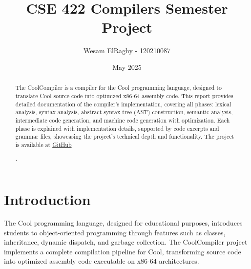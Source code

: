 \documentclass[12pt]{article}
\title{\textbf{CSE 422 Compilers Semester Project }}
\author{Wesam ElRaghy -  120210087}
\date{May 2025}
\begin{document}
\maketitle
\begin{abstract}
The CoolCompiler is a compiler for the Cool programming language, designed to translate Cool source code into optimized x86-64 assembly code. This report provides detailed documentation of the compiler's implementation, covering all phases: lexical analysis, syntax analysis, abstract syntax tree (AST) construction, semantic analysis, intermediate code generation, and machine code generation with optimization. Each phase is explained with implementation details, supported by code excerpts and grammar files, showcasing the project's technical depth and functionality. The project is available at \href{https://github.com/WesamElRaghy/CoolCompiler/tree/main}{GitHub} \newline \newline\newline
\newline
\newline
\newline
\newline
\newline
\newline
\newline
\newline
\newline
\newline
\newline
\newline
\newline
\newline
\newline
\newline
\newline
\newline
\newline
\newline
\newline
\newline
\newline
\newline


.
\end{abstract}


\tableofcontents



\section{Introduction}
The Cool programming language, designed for educational purposes, introduces students to object-oriented programming through features such as classes, inheritance, dynamic dispatch, and garbage collection. The CoolCompiler project implements a complete compilation pipeline for Cool, transforming source code into optimized assembly code executable on x86-64 architectures.
\end{document}
